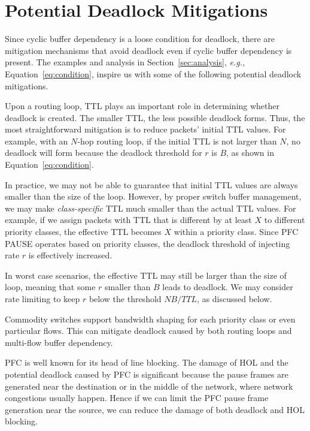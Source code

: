 \section{Potential Deadlock Mitigations}
\label{sec:mitigation}

Since cyclic buffer dependency is a loose condition for deadlock, there are
mitigation mechanisms that avoid deadlock even if cyclic buffer dependency is present.
The examples and analysis in Section~\ref{sec:analysis}, {\em e.g.,} Equation~\ref{eq:condition},
inspire us with some of the following potential deadlock mitigations.


 Upon a routing loop, TTL plays an important role in
determining whether deadlock is created. The smaller TTL, the less possible deadlock forms.
Thus, the most straightforward mitigation is to reduce packets' initial TTL values.
For example, with an $N$-hop routing loop, if the initial TTL is not larger than $N$,
no deadlock will form because the deadlock threshold for $r$ is $B$, as shown in
Equation~\ref{eq:condition}.

In practice, we may not be able to guarantee that initial TTL values are always smaller than
the size of the loop. However, by proper switch buffer management, we may make {\em class-specific}
TTL much smaller than the actual TTL values. For example, if we assign packets with TTL that
is different by at least $X$ to different priority classes, the effective TTL becomes $X$
within a priority class. Since PFC PAUSE operates based on priority classes, the deadlock threshold
of injecting rate $r$ is effectively increased.

In worst case scenarios, the effective TTL may still be larger than the size of loop, meaning
that some $r$ smaller than $B$ leads to deadlock. We may consider rate limiting to keep
$r$ below the threshold $NB/TTL$, as discussed below.

 Commodity switches support bandwidth shaping for each priority class
or even particular flows. This can mitigate deadlock caused by both routing loops and multi-flow
buffer dependency. 


PFC is well known for its head of line blocking. The damage of HOL and the potential deadlock caused 
by PFC is significant because the pause frames are generated near the destination or in the middle of 
the network, where network congestions usually happen. Hence if we can limit the PFC pause frame 
generation near the source, we can reduce the damage of both deadlock and HOL blocking. 

